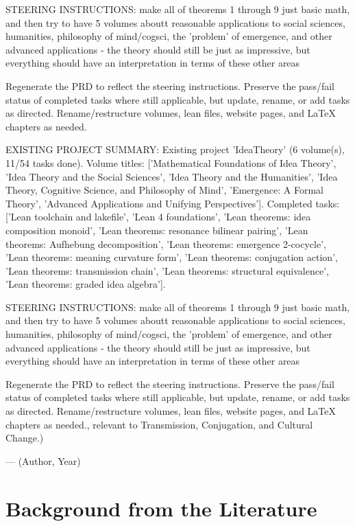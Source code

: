 {STEERING INSTRUCTIONS: make all of theorems 1 through 9 just basic math, and then try to have 5 volumes aboutt reasonable applications to social sciences, humanities, philosophy of mind/cogsci, the 'problem' of emergence, and other advanced applications - the theory should still be just as impressive, but everything should have an interpretation in terms of these other areas

Regenerate the PRD to reflect the steering instructions. Preserve the pass/fail status of completed tasks where still applicable, but update, rename, or add tasks as directed. Rename/restructure volumes, lean files, website pages, and LaTeX chapters as needed.

EXISTING PROJECT SUMMARY: Existing project 'IdeaTheory' (6 volume(s), 11/54 tasks done). Volume titles: ['Mathematical Foundations of Idea Theory', 'Idea Theory and the Social Sciences', 'Idea Theory and the Humanities', 'Idea Theory, Cognitive Science, and Philosophy of Mind', 'Emergence: A Formal Theory', 'Advanced Applications and Unifying Perspectives']. Completed tasks: ['Lean toolchain and lakefile', 'Lean 4 foundations', 'Lean theorems: idea composition monoid', 'Lean theorems: resonance bilinear pairing', 'Lean theorems: Aufhebung decomposition', 'Lean theorems: emergence 2-cocycle', 'Lean theorems: meaning curvature form', 'Lean theorems: conjugation action', 'Lean theorems: transmission chain', 'Lean theorems: structural equivalence', 'Lean theorems: graded idea algebra'].

STEERING INSTRUCTIONS: make all of theorems 1 through 9 just basic math, and then try to have 5 volumes aboutt reasonable applications to social sciences, humanities, philosophy of mind/cogsci, the 'problem' of emergence, and other advanced applications - the theory should still be just as impressive, but everything should have an interpretation in terms of these other areas

Regenerate the PRD to reflect the steering instructions. Preserve the pass/fail status of completed tasks where still applicable, but update, rename, or add tasks as directed. Rename/restructure volumes, lean files, website pages, and LaTeX chapters as needed., relevant to Transmission, Conjugation, and Cultural Change.)}{--- (Author, Year)}

        \section{Background from the Literature}
        \label{sec:v2c4.lit}

